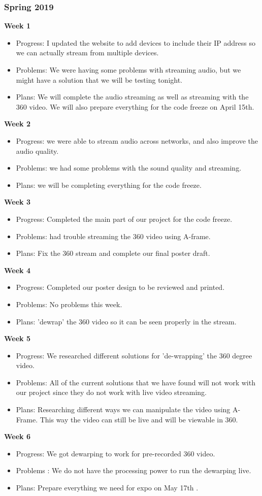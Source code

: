 \subsubsection{Spring 2019}
\textbf{Week 1}
\begin{itemize}
    \item Progress: I updated the website to add devices to include their IP address so we can actually stream from multiple devices.
    \item Problems: We were having some problems with streaming audio, but we might have a solution that we will be testing tonight.
    \item Plans: We will complete the audio streaming as well as streaming with the 360 video. We will also prepare everything for the code freeze on April 15th.
\end{itemize}
\textbf{Week 2}
\begin{itemize}
    \item Progress: we were able to stream audio across networks, and also improve the audio quality. 
    \item Problems: we had some problems with the sound quality and streaming.
    \item Plans: we will be completing everything for the code freeze.
\end{itemize}
\textbf{Week 3}
\begin{itemize}
    \item Progress: Completed the main part of our project for the code freeze.
    \item Problems: had trouble streaming the 360 video using A-frame.
    \item Plans: Fix the 360 stream and complete our final poster draft. 
\end{itemize}
\textbf{Week 4}
\begin{itemize}
    \item Progress: Completed our poster design to be reviewed and printed.
    \item Problems: No problems this week.
    \item Plans: 'dewrap' the 360 video so it can be seen properly in the stream. 
\end{itemize}
\textbf{Week 5}
\begin{itemize}
    \item Progress: We researched different solutions for 'de-wrapping' the 360 degree video.
    \item Problems: All of the current solutions that we have found will not work with our project since they do not work with live video streaming.
    \item Plans: Researching different ways we can manipulate the video using A-Frame. This way  the video can still be live and will be viewable in 360. 
\end{itemize}
\textbf{Week 6}
\begin{itemize}
    \item Progress: We got dewarping to work for pre-recorded 360 video.
    \item Problems : We do not have the processing power to run the dewarping live.
    \item Plans: Prepare everything we need for expo on May 17th . 
\end{itemize}